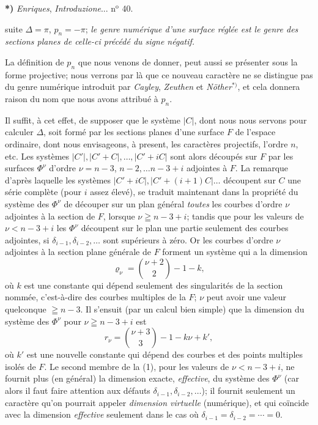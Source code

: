 \documentclass{article}
\begin{document}
\textbf{*)} \emph{Enriques}, \emph{Introduzione}... n${}^{\text{o}}$ 40.

suite $\Delta = \pi$, $p_{n} = -\pi$; \emph{le genre numérique d'une surface réglée est le genre des sections planes de celle-ci précédé du signe négatif.}

La définition de $p_{n}$ que nous venons de donner, peut aussi se présenter sous la forme projective; nous verrons par là que ce nouveau caractère ne se distingue pas du genre numérique introduit par \emph{Cayley}, \emph{Zeuthen} et \emph{Nöther}${}^{*)}$, et cela donnera raison du nom que nous avons attribué à $p_{n}$.

Il suffit, à cet effet, de supposer que le système $|C|$, dont nous nous servons pour calculer $\Delta$, soit formé par les sections planes d'une surface $F$ de l'espace ordinaire, dont nous envisageons, à present, les caractères projectifs, l'ordre $n$, etc. Les systèmes $|C'|, |C'+C|, \ldots, |C'+iC|$ sont alors découpés sur $F$ par les surfaces $\Phi^{\nu}$ d'ordre $\nu = n-3$, $n-2, \ldots n-3+i$ adjointes à $F$. La remarque d'après laquelle les systèmes $|C'+iC|, |C'+(i+1)C| \ldots$ découpent sur $C$ une série complète (pour $i$ assez élevé), se traduit maintenant dans la propriété du système des $\Phi^{\nu}$ de découper sur un plan général \emph{toutes} les courbes d'ordre $\nu$ adjointes à la section de $F$, lorsque $\nu \geqq n-3+i$; tandis que pour les valeurs de $\nu < n-3+i$ les $\Phi^{\nu}$ découpent sur le plan une partie seulement des courbes adjointes, si $\delta_{i-1}, \delta_{i-2}, \ldots$ sont supérieurs à zéro. Or les courbes d'ordre $\nu$ adjointes à la section plane générale de $F$ forment un système qui a la dimension
\[
\varrho_{\nu} = \binom{\nu+2}{2} - 1 - k,
\]
où $k$ est une constante qui dépend seulement des singularités de la section nommée, c'est-à-dire des courbes multiples de la $F$; $\nu$ peut avoir une valeur quelconque $\geqq n-3$. Il s'ensuit (par un calcul bien simple) que la dimension du système des $\Phi^{\nu}$ pour $\nu \geqq n-3+i$ est
\[
r_{\nu} = \binom{\nu+3}{3} - 1 - k\nu + k', \tag{1}
\]
où $k'$ est une nouvelle constante qui dépend des courbes et des points multiples isolés de $F$. Le second membre de la (1), pour les valeurs de $\nu < n-3+i$, ne fournit plus (en général) la dimension exacte, \emph{effective}, du système des $\Phi^{\nu}$ (car alors il faut faire attention aux défauts $\delta_{i-1}, \delta_{i-2}, \ldots$); il fournit seulement un caractère qu'on pourrait appeler \emph{dimension virtuelle} (numérique), et qui coïncide avec la dimension \emph{effective} seulement dans le cas où $\delta_{i-1} = \delta_{i-2} = \cdots = 0$.
\end{document}

